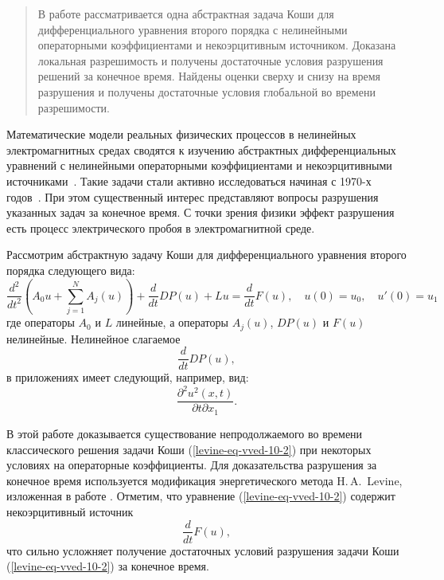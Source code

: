 \maketitle

\begin{abstract}
В работе рассматривается одна абстрактная задача Коши для дифференциального уравнения второго порядка с нелинейными операторными коэффициентами и некоэрцитивным источником. Доказана локальная разрешимость и получены достаточные условия разрушения решений за конечное время. Найдены оценки сверху и снизу на время разрушения и получены достаточные условия глобальной во времени разрешимости.

\end{abstract}


Математические модели реальных физических процессов в нелинейных электромагнитных средах сводятся к изучению абстрактных дифференциальных уравнений с нелинейными операторными коэффициентами и некоэрцитивными источниками~\cite{korpusov3,rab1}. Такие задачи стали активно исследоваться начиная с 1970-х годов~\cite{levine2,Straughan,Kalantar}. При этом существенный интерес представляют вопросы разрушения указанных задач за конечное время. С точки зрения физики эффект разрушения есть процесс электрического пробоя в электромагнитной среде.	

Рассмотрим абстрактную задачу Коши для дифференциального уравнения второго порядка следующего вида:
\begin{equation}\label{levine-eq-vved-10-2}
	\dfrac{d^2}{d t^2}\left(A_0u+\sum\limits_{j=1}^NA_j(u)\right)+\dfrac{d}{d t}DP(u)+Lu=\dfrac{d}{d t}F(u),\quad u(0)=u_0,\quad u'(0)=u_1
\end{equation}
где операторы $A_0$ и $L$ линейные, а операторы $A_j(u)$, $DP(u)$ и $F(u)$ нелинейные. Нелинейное слагаемое
$$
\dfrac{d}{d t}DP(u),
$$
в приложениях имеет следующий, например, вид:
$$
\dfrac{\partial^2 u^2(x,t)}{\partial t\partial x_1}.
$$

В этой работе доказывается существование непродолжаемого во времени классического решения задачи Коши  (\ref{levine-eq-vved-10-2}) при некоторых условиях на операторные коэффициенты. Для доказательства разрушения за конечное время используется модификация энергетического метода H.\,A.~Levine, изложенная в работе \cite{korpusov3}. Отметим, что уравнение (\ref{levine-eq-vved-10-2}) содержит некоэрцитивный источник
$$
\dfrac{d}{d t}F(u),
$$
что сильно усложняет получение достаточных условий разрушения задачи Коши (\ref{levine-eq-vved-10-2}) за конечное время. 

